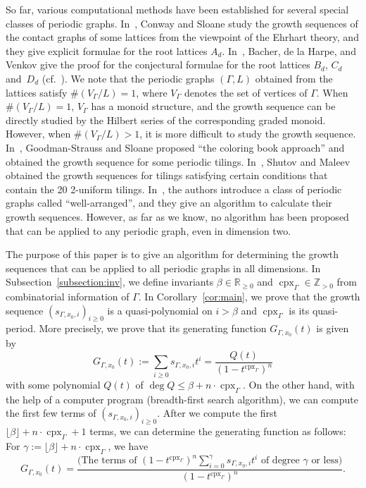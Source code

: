 So far, various computational methods have been established for several special classes of periodic graphs. 
In~\cite{CS97}, Conway and Sloane study the growth sequences of the contact graphs of some lattices from the viewpoint of the Ehrhart theory, and they give explicit formulae for the root lattices $A_d$. 
In~\cite{BHV99}, Bacher, de la Harpe, and Venkov give the proof for the conjectural formulae for the root lattices $B_d$, $C_d$ and~$D_d$ (cf.\ \cite{ABHPS}). 
We note that the periodic graphs $(\Gamma, L)$ obtained from the lattices satisfy $\# (V_{\Gamma} /L) = 1$, where $V_{\Gamma}$ denotes the set of vertices of $\Gamma$. 
When $\# (V_{\Gamma} /L) = 1$, $V_{\Gamma}$ has a monoid structure, and the growth sequence can be directly studied by the Hilbert series of the corresponding graded monoid. 
However, when $\# (V_{\Gamma} /L) > 1$, it is more difficult to study the growth sequence. 
In~\cite{GS19}, Goodman-Strauss and Sloane proposed ``the coloring book approach'' 
and obtained the growth sequence for some periodic tilings. 
In~\cite{SM19, SM20a}, Shutov and Maleev obtained the growth sequences for 
tilings satisfying certain conditions that contain the 20 2-uniform tilings. 
In~\cite{IN}, the authors introduce a class of periodic graphs called ``well-arranged'', and they give an algorithm to calculate their growth sequences. However, as far as we know, no algorithm has been proposed that can be applied to any periodic graph, even in dimension two. 

The purpose of this paper is to give an algorithm for determining 
the growth sequences that can be applied to all periodic graphs in all dimensions. 
In Subsection~\ref{subsection:inv}, we define invariants $\beta \in \mathbb{R}_{\ge 0}$ and 
$\operatorname{cpx}_{\Gamma} \in \mathbb{Z}_{>0}$ from combinatorial information of $\Gamma$. 
In Corollary~\ref{cor:main}, we prove that the growth sequence $(s_{\Gamma, x_0, i})_{i \ge 0}$ is a quasi-polynomial on 
$i > \beta$ and $\operatorname{cpx}_{\Gamma}$ is its quasi-period.  
More precisely, we prove that its generating function $G_{\Gamma, x_0}(t)$ is given by 
\[
G_{\Gamma, x_0}(t) := \sum _{i \ge 0} s_{\Gamma, x_0, i} t^i = \frac{Q(t)}{(1-t^{\operatorname{cpx}_{\Gamma}}) ^n}
\]
with some polynomial $Q(t)$ of $\deg Q \le \beta + n \cdot \operatorname{cpx}_{\Gamma}$. 
On the other hand, with the help of a computer program (breadth-first search algorithm), 
we can compute the first few terms of $(s_{\Gamma, x_0, i})_{i \ge 0}$. 
After we compute the first $\lfloor \beta \rfloor + n \cdot \operatorname{cpx}_{\Gamma} + 1$ terms, 
we can determine the generating function as follows: For $\gamma := \lfloor \beta \rfloor + n \cdot \operatorname{cpx}_{\Gamma}$, 
we have 
\[
G_{\Gamma, x_0}(t) = \frac{\bigl( \text{The terms of $(1-t^{\operatorname{cpx}_{\Gamma}}) ^n \sum _{i = 0} ^{\gamma} s_{\Gamma, x_0, i} t^i$ of degree $\gamma$ or less}\bigr)}{(1-t^{\operatorname{cpx}_{\Gamma}}) ^n}. 
\]


